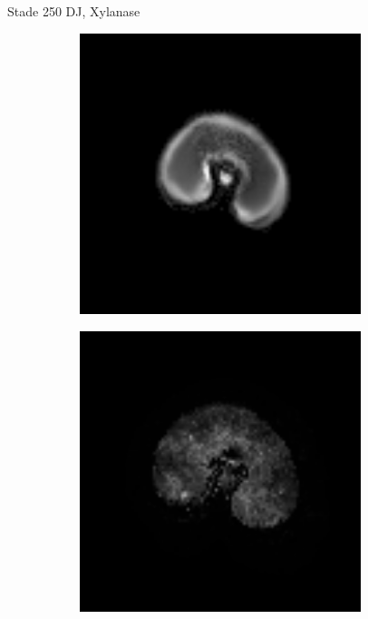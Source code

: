 \documentclass[10pt]{beamer}
\begin{document}
\begin{frame}{Stade 250 DJ, Xylanase}
  \begin{figure}[ht]
    \centering
    \begin{subfigure}[t]{0.33\textwidth}
      \centering
      \includegraphics[width=0.9\textwidth]{fig/stats_250Xyl_density_irm}
    \end{subfigure}%
    \begin{subfigure}[t]{0.33\textwidth}
      \centering
      \includegraphics[width=0.9\textwidth]{fig/stats_250Xyl_density}
    \end{subfigure}%
    
  \end{figure}

  
\end{frame}
\end{document}
